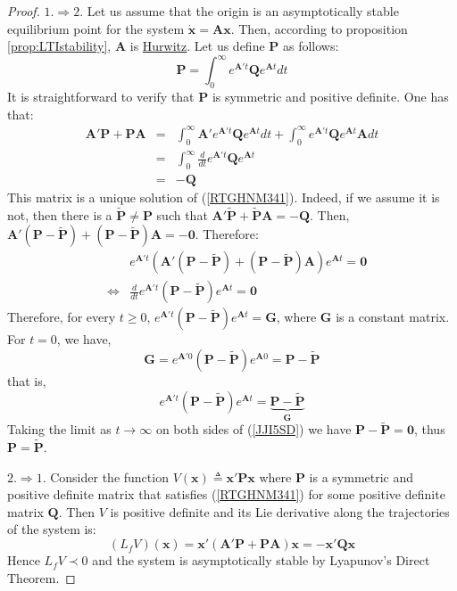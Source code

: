 \documentclass[a4paper,10pt,oneside]{book}
\begin{document}
\begin{proof}
 $1.\Rightarrow 2.$ Let us assume that the origin is an asymptotically stable equilibrium
point for the system $\dot{\mathbf{x}}=\mathbf{Ax}$. Then, according to proposition 
\ref{prop:LTIstability}, $\mathbf{A}$ is \hyperlink{def:hurwitz}{Hurwitz}. Let us define $\mathbf P$
as follows:
\begin{equation}
 \mathbf{P}=\int_0^\infty e^{\mathbf A't}\mathbf Qe^{\mathbf At}dt
\end{equation}
It is straightforward to verify that $\mathbf{P}$ is symmetric and positive definite. One has that:
\begin{eqnarray}
 \mathbf{A}'\mathbf{P}+\mathbf{PA}&=&
	    \int_0^\infty \mathbf A' e^{\mathbf A't}\mathbf Qe^{\mathbf At} dt + 
	    \int_0^\infty e^{\mathbf A't}\mathbf Qe^{\mathbf At} \mathbf A dt\\
&=&\int_0^\infty \frac{d}{dt}e^{\mathbf A't}\mathbf Qe^{\mathbf At}\\
&=&-\mathbf Q
\end{eqnarray}
This matrix is a unique solution of (\ref{RTGHNM341}). Indeed, if we assume it is not, then
there is a $\tilde{\mathbf{P}}\neq \mathbf P$ such that $\mathbf A'\tilde{\mathbf{P}}+\tilde{\mathbf{P}}\mathbf{A}=-\mathbf Q$.
Then, $\mathbf A'(\mathbf{P}-\tilde{\mathbf{P}})+(\mathbf{P}-\tilde{\mathbf{P}})\mathbf{A}=-\mathbf 0$. Therefore:
\begin{eqnarray}
&& e^{\mathbf{A}'t}
\left( \mathbf A'(\mathbf{P}-\tilde{\mathbf{P}})+(\mathbf{P}-\tilde{\mathbf{P}})\mathbf{A} \right)
e^{\mathbf{A}t}=\mathbf{0}\\
&\Leftrightarrow& \frac{d}{dt}e^{\mathbf{A}'t}(\mathbf{P}-\tilde{\mathbf{P}})e^{\mathbf{A}t}=\mathbf 0
\end{eqnarray}
Therefore, for every $t\geq 0$,
 $e^{\mathbf{A}'t}(\mathbf{P}-\tilde{\mathbf{P}})e^{\mathbf{A}t}=\mathbf G$, where $\mathbf G$
is a constant matrix. For $t=0$, we have,
\begin{equation}
 \mathbf G=e^{\mathbf{A}'0}(\mathbf{P}-\tilde{\mathbf{P}})e^{\mathbf{A}0}=\mathbf{P}-\tilde{\mathbf{P}}
\end{equation}
that is,
\begin{equation}\label{JJI5SD}
 e^{\mathbf{A}'t}(\mathbf{P}-\tilde{\mathbf{P}})e^{\mathbf{A}t}=\underbrace{ \mathbf{P}-\tilde{\mathbf{P}}}_{\mathbf G}
\end{equation}
Taking the limit as $t\to\infty$ on both sides of (\ref{JJI5SD}) we have $\mathbf{P}-\tilde{\mathbf{P}}=\mathbf{0}$, thus
$\mathbf{P}=\tilde{\mathbf{P}}$.

$2.\Rightarrow 1.$ Consider the function $V(\mathbf x)\triangleq \mathbf{x}'\mathbf{Px}$ where $\mathbf P$
is a symmetric and positive definite matrix that satisfies (\ref{RTGHNM341}) for some positive definite
matrix $\mathbf{Q}$. Then $V$ is positive definite
and its Lie derivative along the trajectories of the system is:
\begin{equation}
 (L_f V)(\mathbf x)=\mathbf x'\left( \mathbf{A}'\mathbf{P}+\mathbf{PA}  \right)\mathbf x
=-\mathbf x'\mathbf{Qx} 
\end{equation}
Hence $L_f V\prec 0$ and the system is asymptotically stable by Lyapunov's Direct Theorem.
\end{proof}
\end{document}
